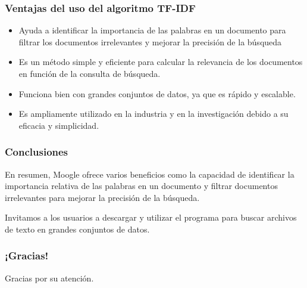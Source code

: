 \documentclass{beamer}
\begin{document}
\begin{frame}
    \frametitle{Ventajas del uso del algoritmo TF-IDF}
        \begin{itemize}
            \item Ayuda a identificar la importancia de las palabras en un documento para filtrar los documentos irrelevantes y mejorar la precisión de la búsqueda
            \item Es un método simple y eficiente para calcular la relevancia de los documentos en función de la consulta de búsqueda.
            \item Funciona bien con grandes conjuntos de datos, ya que es rápido y escalable.
            \item Es ampliamente utilizado en la industria y en la investigación debido a su eficacia y simplicidad.
        \end{itemize}
\end{frame}
    
\begin{frame}
    \frametitle{Conclusiones}
    En resumen, Moogle ofrece varios beneficios como la capacidad de identificar la importancia relativa de las palabras en un documento y filtrar documentos irrelevantes para mejorar la precisión de la búsqueda.

    Invitamos a los usuarios a descargar y utilizar el programa para buscar archivos de texto en grandes conjuntos de datos.
\end{frame}

\begin{frame}
  \frametitle{¡Gracias!}
  Gracias por su atención.
\end{frame}
\end{document}

